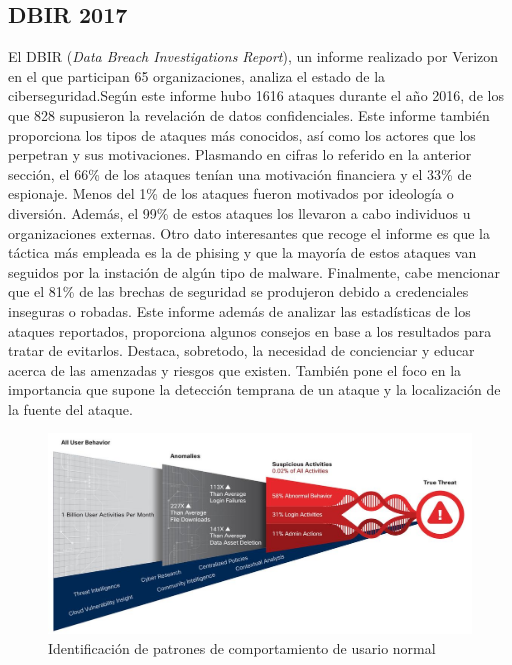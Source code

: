 \subsection{DBIR 2017}
El DBIR (\textit{Data Breach Investigations Report}), un informe realizado por Verizon en el que participan 65 organizaciones, analiza el estado de la ciberseguridad.Según este informe hubo 1616 ataques durante el año 2016, de los que 828 supusieron la revelación de datos confidenciales. Este informe también proporciona los tipos de ataques más conocidos, así como los actores que los perpetran y sus motivaciones. Plasmando en cifras lo referido en la anterior sección, el 66\% de los ataques tenían una motivación financiera y el 33\% de espionaje. Menos del 1\% de los ataques fueron motivados por ideología o diversión. Además, el 99\% de estos ataques los llevaron a cabo individuos u organizaciones externas. Otro dato interesantes que recoge el informe es que la táctica más empleada es la de phising y que la mayoría de estos ataques van seguidos por la instación de algún tipo de malware. Finalmente, cabe mencionar que el 81\% de las brechas de seguridad se produjeron debido a credenciales inseguras o robadas. Este informe además de analizar las estadísticas de los ataques reportados, proporciona algunos consejos en base a los resultados para tratar de evitarlos. Destaca, sobretodo, la necesidad de concienciar y educar acerca de las amenzadas y riesgos que existen. También pone el foco en la importancia que supone la detección temprana de un ataque y la localización de la fuente del ataque\cite{DBIR2017}.
\begin{figure}[t]
\centering
\includegraphics[width=1\textwidth]{images/userBehavior.png}
\caption{Identificación de patrones de comportamiento de usario normal}
\label{fig:behavior}
\end{figure}


